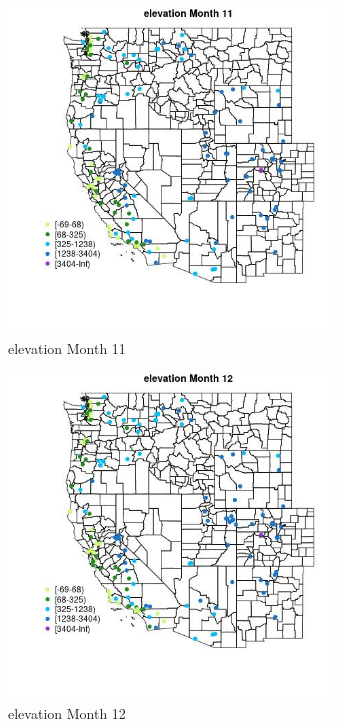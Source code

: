 \begin{figure} 
\centering  
\includegraphics[width=0.77\textwidth]{Code_Outputs/Report_ML_input_PM25_Step4_part_e_de_duplicated_aveswNAs_MapObsMo11elevation.jpg} 
\caption{\label{fig:Report_ML_input_PM25_Step4_part_e_de_duplicated_aveswNAsMapObsMo11elevation}elevation Month 11} 
\end{figure} 
 

\begin{figure} 
\centering  
\includegraphics[width=0.77\textwidth]{Code_Outputs/Report_ML_input_PM25_Step4_part_e_de_duplicated_aveswNAs_MapObsMo12elevation.jpg} 
\caption{\label{fig:Report_ML_input_PM25_Step4_part_e_de_duplicated_aveswNAsMapObsMo12elevation}elevation Month 12} 
\end{figure} 
 

